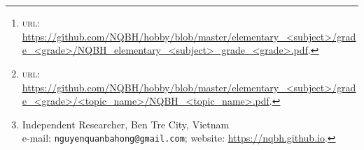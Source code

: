 \documentclass{article}
\title{}
\author{Nguyễn Quản Bá Hồng\footnote{Independent Researcher, Ben Tre City, Vietnam\\e-mail: \texttt{nguyenquanbahong@gmail.com}; website: \url{https://nqbh.github.io}.}}
\date{\today}
\begin{document}
\maketitle
\begin{abstract}
	\textsc{[en]} This text is a collection of problems, from easy to advanced, about \textit{<topic>}. This text is also a supplementary material for my lecture note on Elementary <Subject> grade <grade>, which is stored \& downloadable at the following link: \href{https://github.com/NQBH/hobby/blob/master/elementary_<subject>/grade_<grade>/NQBH_elementary_<subject>_grade_<grade>.pdf}{GitHub\texttt{/}NQBH\texttt{/}hobby\texttt{/}elementary <subject>\texttt{/}grade <grade>\texttt{/}lecture}\footnote{\textsc{url}: \url{https://github.com/NQBH/hobby/blob/master/elementary_<subject>/grade_<grade>/NQBH_elementary_<subject>_grade_<grade>.pdf}.}. The latest version of this text has been stored \& downloadable at the following link: \href{https://github.com/NQBH/hobby/blob/master/elementary_<subject>/grade_<grade>/<topic_name>/NQBH_<topic_name>.pdf}{GitHub\texttt{/}NQBH\texttt{/}hobby\texttt{/}elementary <subject>\texttt{/}grade <grade>\texttt{/}<topic>}\footnote{\textsc{url}: \url{https://github.com/NQBH/hobby/blob/master/elementary_<subject>/grade_<grade>/<topic_name>/NQBH_<topic_name>.pdf}.}.
	\vspace{2mm}
	
	\textsc{[vi]} Tài liệu này là 1 bộ sưu tập các bài tập chọn lọc từ cơ bản đến nâng cao về \textit{<topic vi>}. Tài liệu này là phần bài tập bổ sung cho tài liệu chính -- bài giảng \href{https://github.com/NQBH/hobby/blob/master/elementary_<subject>/grade_<grade>/NQBH_elementary_<subject>_grade_<grade>.pdf}{GitHub\texttt{/}NQBH\texttt{/}hobby\texttt{/}elementary <subject>\texttt{/}grade <grade>\texttt{/}lecture} của tác giả viết cho <Subject> Sơ Cấp lớp <grade>. Phiên bản mới nhất của tài liệu này được lưu trữ \& có thể tải xuống ở link sau: \href{https://github.com/NQBH/hobby/blob/master/elementary_<subject>/grade_<grade>/<topic_name>/NQBH_<topic_name>.pdf}{GitHub\texttt{/}NQBH\texttt{/}hobby\texttt{/}elementary <subject>\texttt{/}grade <grade>\texttt{/}<topic>}.
	
	\textsf{\textbf{Nội dung.} }
\end{abstract}
\tableofcontents
\newpage


\section{}


\printbibliography[heading=bibintoc]
	
\end{document}
